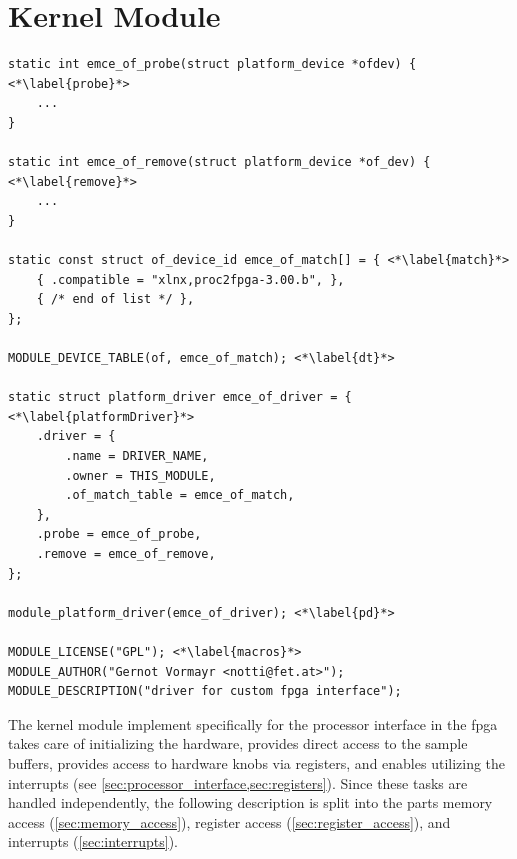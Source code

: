 \documentclass[12pt,a4paper,parskip=full,abstract=true,BCOR=12mm,twoside,open=right]{scrreprt}
\newcommand{\hack}{}
\begin{document}

\section{Kernel Module}
\label{sec:kernel_module}

\begin{lstlisting}[float=htb,caption={Basic elements of a platform driver module},label=src:pdriver,basicstyle=\hack\scriptsize]
static int emce_of_probe(struct platform_device *ofdev) { <*\label{probe}*>
	...
}

static int emce_of_remove(struct platform_device *of_dev) { <*\label{remove}*>
	...
}

static const struct of_device_id emce_of_match[] = { <*\label{match}*>
	{ .compatible = "xlnx,proc2fpga-3.00.b", },
	{ /* end of list */ },
};

MODULE_DEVICE_TABLE(of, emce_of_match); <*\label{dt}*>

static struct platform_driver emce_of_driver = { <*\label{platformDriver}*>
	.driver = {
		.name = DRIVER_NAME,
		.owner = THIS_MODULE,
		.of_match_table = emce_of_match,
	},
	.probe = emce_of_probe,
	.remove = emce_of_remove,
};

module_platform_driver(emce_of_driver); <*\label{pd}*>

MODULE_LICENSE("GPL"); <*\label{macros}*>
MODULE_AUTHOR("Gernot Vormayr <notti@fet.at>");
MODULE_DESCRIPTION("driver for custom fpga interface");
\end{lstlisting}

The kernel module implement specifically for the processor interface
in the \gls{fpga} takes care of initializing the hardware, provides
direct access to the sample buffers, provides access to hardware knobs
via registers, and enables utilizing the interrupts (see
\cref{sec:processor_interface,sec:registers}). Since these tasks are
handled independently, the following description is split into the parts
memory access (\cref{sec:memory_access}), register access
(\cref{sec:register_access}), and interrupts (\cref{sec:interrupts}).
\end{document}
